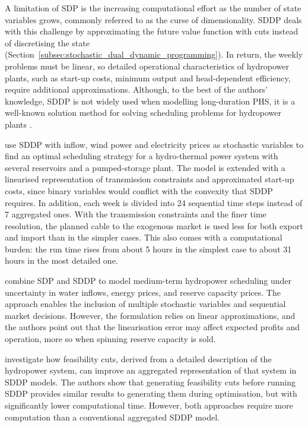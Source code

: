 A limitation of SDP is the increasing computational effort as the number of state variables grows, commonly referred to as the curse of dimensionality. SDDP deals with this challenge by approximating the future value function with cuts instead of discretising the state (Section~\ref{subsec:stochastic_dual_dynamic_programming}). In return, the weekly problems must be linear, so detailed operational characteristics of hydropower plants, such as start-up costs, minimum output and head-dependent efficiency, require additional approximations. Although, to the best of the authors' knowledge, SDDP is not widely used when modelling long-duration PHS, it is a well-known solution method for solving scheduling problems for hydropower plants \parencite{fullnerRebennack2025, helseth2016, hjelmeland2019energies}. %

\textcite{helseth2013} %
use SDDP with inflow, wind power and electricity prices as stochastic variables to find an optimal scheduling strategy for a hydro-thermal power system with several reservoirs and a pumped-storage plant. The model is extended with a linearised representation of transmission constraints and approximated start-up costs, since binary variables would conflict with the convexity that SDDP requires. In addition, each week is divided into 24 sequential time steps instead of 7 aggregated ones. With the transmission constraints and the finer time resolution, the planned cable to the exogenous market is used less for both export and import than in the simpler cases. This also comes with a computational burden: the run time rises from about 5 hours in the simplest case to about 31 hours in the most detailed one.

\textcite{helseth2016} %
combine SDP and SDDP to model medium-term hydropower scheduling under uncertainty in water inflows, energy prices, and reserve capacity prices. The approach enables the inclusion of multiple stochastic variables and sequential market decisions. However, the formulation relies on linear approximations, and the authors point out that the linearisation error may affect expected profits and operation, more so when spinning reserve capacity is sold.

\textcite{helseth2023hydropowera} investigate how feasibility cuts, derived from a detailed description of the hydropower system, can improve an aggregated representation of that system in SDDP models. The authors show that generating feasibility cuts before running SDDP provides similar results to generating them during optimisation, but with significantly lower computational time. %
However, both approaches require more computation than a conventional aggregated SDDP model.

